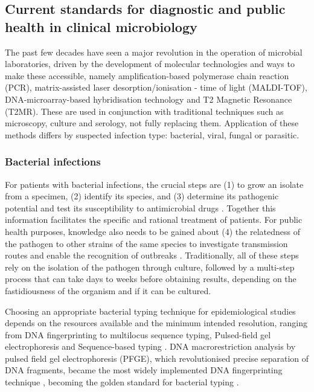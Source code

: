 \subsection{Current standards for diagnostic and public health in clinical microbiology}

The past few decades have seen a major revolution in the operation of microbial laboratories, driven by the development of molecular technologies and ways to make these accessible, namely amplification-based polymerase chain reaction (PCR), matrix-assisted laser desorption/ionisation - time of light (MALDI-TOF), DNA-microarray-based hybridisation technology and T2 Magnetic Resonance (T2MR). These are used in conjunction with traditional techniques such as microscopy, culture and serology, not fully replacing them. Application of these methods differs by suspected infection type: bacterial, viral, fungal or parasitic.

\subsubsection{Bacterial infections}

For patients with bacterial infections, the crucial steps are (1) to grow an isolate from a specimen, (2) identify its species, and (3) determine its pathogenic potential and test its susceptibility to antimicrobial drugs  \citep{didelot_transforming_2012}. Together this information facilitates the specific and rational treatment of patients. For public health purposes, knowledge also needs to be gained about (4) the relatedness of the pathogen to other strains of the same species to investigate transmission routes and enable the recognition of outbreaks \citep{foxman_choosing_2005}. Traditionally, all of these steps rely on the isolation of the pathogen through culture, followed by a multi-step process that can take days to weeks before obtaining results, depending on the fastidiousness of the organism and if it can be cultured. 

Choosing an appropriate bacterial typing technique for epidemiological studies depends on the resources available and the minimum intended resolution, ranging from DNA fingerprinting to multilocus sequence typing, Pulsed-field gel electrophoresis and Sequence-based typing \citep{allerberger_molecular_2012,foxman_choosing_2005}. DNA macrorestriction analysis by pulsed field gel electrophoresis (PFGE), which revolutionised precise separation of DNA fragments, became the most widely implemented DNA fingerprinting technique \citep{allerberger_molecular_2012}, becoming the golden standard for bacterial typing \citep{neoh_pulsed-field_2019} .

